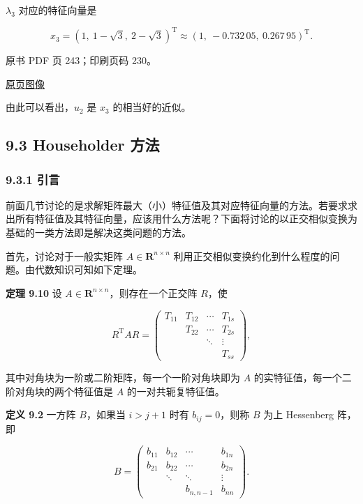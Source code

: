 \(\lambda_3\) 对应的特征向量是

\[
x_3=(1,\ 1-\sqrt3,\ 2-\sqrt3)^{\mathrm T}\approx(1,\ -0.732\,05,\ 0.267\,95)^{\mathrm T}.
\]

\clearpage

原书 PDF 页 243；印刷页码 230。

\href{source-images/pdf-243.jpeg}{原页图像}

由此可以看出，\(u_2\) 是 \(x_3\) 的相当好的近似。

\subsection{9.3 Householder 方法}\label{ch09a-householder-ux65b9ux6cd5}

\subsubsection{9.3.1 引言}\label{ch09a-ux5f15ux8a00-1}

前面几节讨论的是求解矩阵最大（小）特征值及其对应特征向量的方法。若要求求出所有特征值及其特征向量，应该用什么方法呢？下面将讨论的以正交相似变换为基础的一类方法即是解决这类问题的方法。

首先，讨论对于一般实矩阵 \(A\in\mathbf R^{n\times n}\) 利用正交相似变换约化到什么程度的问题。由代数知识可知如下定理。

\textbf{定理 9.10} 设 \(A\in\mathbf R^{n\times n}\)，则存在一个正交阵 \(R\)，使

\[
R^{\mathrm T}AR=\begin{pmatrix}
T_{11}&T_{12}&\cdots&T_{1s}\\
&T_{22}&\cdots&T_{2s}\\
&&\ddots&\vdots\\
&&&T_{ss}
\end{pmatrix},
\]

其中对角块为一阶或二阶矩阵，每一个一阶对角块即为 \(A\) 的实特征值，每一个二阶对角块的两个特征值是 \(A\) 的一对共轭复特征值。

\textbf{定义 9.2} 一方阵 \(B\)，如果当 \(i>j+1\) 时有 \(b_{ij}=0\)，则称 \(B\) 为上 Hessenberg 阵，即

\[
B=\begin{pmatrix}
b_{11}&b_{12}&\cdots&b_{1n}\\
b_{21}&b_{22}&\cdots&b_{2n}\\
&\ddots&\ddots&\vdots\\
&&b_{n,n-1}&b_{nn}
\end{pmatrix}.
\]

